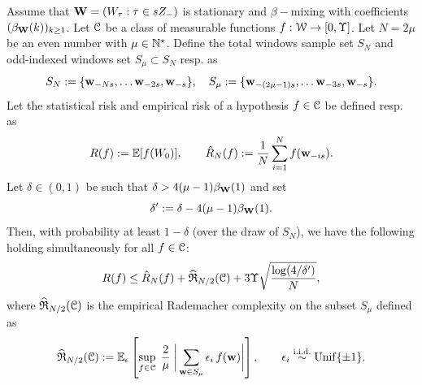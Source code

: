 \begin{theorem}\label{thm:mohri-rostamizadeh}
    Assume that ${\mathbf{W}} = (W_\tau : \tau \in s Z_-)$ is stationary and $\beta-$mixing with coefficients $(\beta_{{\mathbf{W}}}(k))_{k \geq 1}$. Let ${\mathcal{C}}$ be a class of measurable functions $f: {\mathcal{W}} \to [0, \Upsilon]$. Let $N = 2\mu$ be an even number with $\mu \in {\mathbb{N}}^\star$. Define the total windows sample set $S_N$ and odd-indexed windows set $S_\mu \subset S_N$ resp. as
    \begin{equation*}
        S_N := \{{\mathbf{w}}_{-Ns}, \ldots {\mathbf{w}}_{-2s}, {\mathbf{w}}_{-s}\}, \quad S_{\mu} := \{{\mathbf{w}}_{-(2\mu - 1) s}, \ldots {\mathbf{w}}_{-3s}, {\mathbf{w}}_{-s}\}.
    \end{equation*}
    Let the statistical risk and empirical risk  of a hypothesis $f \in {\mathcal{C}}$ be defined resp. as
    \begin{equation*}
        R(f) := \mathbb{E}[f(W_0)], \qquad \hat{R}_N(f) := \frac{1}{N} \sum_{i=1}^N f({\mathbf{w}}_{-is}).
    \end{equation*}
    Let $\delta \in (0,1)$ be such that $\delta > 4 (\mu - 1) \beta_{{\mathbf{W}}}(1)$ and set $$\delta' := \delta - 4 (\mu - 1) \beta_{{\mathbf{W}}}(1).$$
    Then, with probability at least $1-\delta$ (over the draw of $S_N$), we have the following holding simultaneously for all $f \in {\mathcal{C}}$:
    \begin{equation}\label{eq:Mohri-Rostamizadeh-risk-bound}
        R(f) \leq \hat{R}_N(f) + \widehat{\mathfrak{R}}_{N/2}({\mathcal{C}}) + 3 \Upsilon \sqrt{\frac{\log(4/\delta')}{N}},
    \end{equation}
    where $\widehat{\mathfrak{R}}_{N/2}({\mathcal{C}})$ is the empirical Rademacher complexity on the subset $S_\mu$ defined as
    \begin{equation*}
        \widehat{\mathfrak{R}}_{N/2}({\mathcal{C}}) := \mathbb{E}_{\epsilon}\left[\sup_{f \in {\mathcal{C}}} \; \frac{2}{\mu} \; \bigg| \sum_{{\mathbf{w}} \in S_\mu} \epsilon_i \, f({\mathbf{w}}) \bigg|\right], \qquad \epsilon_i \stackrel{\text{i.i.d.}}{\sim}\mathrm{Unif}\{\pm 1\}.
    \end{equation*}
\end{theorem}

